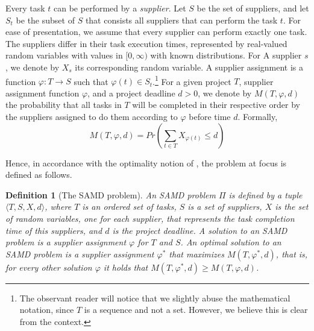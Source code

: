 \documentclass[letterpaper]{article}
\newtheorem{definition}{Definition}
\newcommand{\samd}{\ac{SAMD}\xspace}
\begin{document}
Every task $t$ can be performed by a \emph{supplier}.
Let $S$ be the set of suppliers, and let $S_t$ be the subset of $S$ that consists all suppliers that
can perform the task $t$. For ease of presentation, we assume that every supplier can perform exactly one task. The suppliers differ in their task execution times, represented by real-valued random variables with values in $[0, \infty)$ with known distributions. For A supplier $s$, we denote by $X_s$ its corresponding random variable.
A supplier assignment is a function $\varphi: T\rightarrow S$ such that $\varphi(t)\in S_t$.\footnote{The observant reader will notice that we slightly abuse the mathematical notation, since $T$ is a sequence and not a set. However, we believe this is clear from the context.}
For a given project $T$, supplier assignment function $\varphi$, and a project deadline $d>0$, we denote by
$M(T, \varphi, d)$ the probability that
all tasks in $T$ will be completed in their respective order by the suppliers assigned to do them according to $\varphi$
before time $d$. Formally,
\begin{equation}
M(T, \varphi, d) = Pr\left(\sum_{t\in T} X_{\varphi(t)}\leq d\right)
 \label{eq:objective}
\end{equation}

Hence, in accordance with the optimality notion of \citeauthor{frank1969shortest},
the problem at focus is defined as follows.
\begin{definition}[The \samd problem]
An \samd problem $\Pi$ is defined by a tuple
 $\langle T, S, X, d\rangle$,
 where $T$ is an ordered set of tasks,
 $S$ is a set of suppliers,
 $X$ is the set of random variables, one for each supplier, that represents the task completion time of this suppliers,
 and $d$ is the project deadline.
 A solution to an \samd problem is a supplier assignment $\varphi$ for $T$ and $S$. An optimal solution to an \samd problem is
 a supplier assignment $\varphi^*$ that maximizes $M(T, \varphi^*, d)$, that is, for every other solution  $\varphi$ it holds that $M(T, \varphi^*, d)\geq M(T, \varphi, d)$.
\end{definition}
\end{document}

